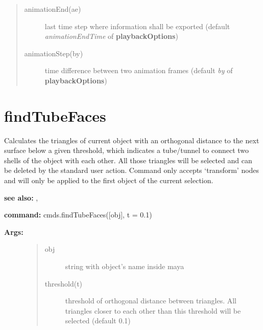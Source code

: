\documentclass[letterpaper,10pt,english]{sphinxmanual}
\begin{document}
\begin{description}
\begin{quote}
\begin{description}
\item[{animationEnd(ae)}] \leavevmode
last time step where information shall be exported (default \emph{animationEndTime} of \textbf{playbackOptions})

\item[{animationStep(by)}] \leavevmode
time difference between two animation frames (default \emph{by} of \textbf{playbackOptions})

\end{description}\end{quote}

\end{description}


\section{findTubeFaces}
\label{pk_src.findTubeFaces::doc}\label{pk_src.findTubeFaces:findtubefaces}\label{pk_src.findTubeFaces:id1}
{\hyperref[index:commands]{}}
\label{pk_src.findTubeFaces:module-pk_src.findTubeFaces}
Calculates the triangles of current object with an orthogonal distance to the next surface below a given threshold, which indicates a tube/tunnel to connect two shells of the object with each other. All those triangles will be selected and can be deleted by the standard user action.
Command only accepts `transform' nodes and will only be applied to the first object of the current selection.

\textbf{see also:} {\hyperref[pk_src.cleanup:cleanup]{}}, {\hyperref[pk_src.getShells:getshells]{}}

\textbf{command:} cmds.findTubeFaces({[}obj{]}, t = 0.1)
\begin{description}
\item[{\textbf{Args:}}] \leavevmode\begin{quote}\begin{description}
\item[{obj}] \leavevmode
string with object's name inside maya

\item[{threshold(t)}] \leavevmode
threshold of orthogonal distance between triangles. All triangles closer to each other than this threshold will be selected (default 0.1)

\end{description}\end{quote}

\end{description}
\end{document}

